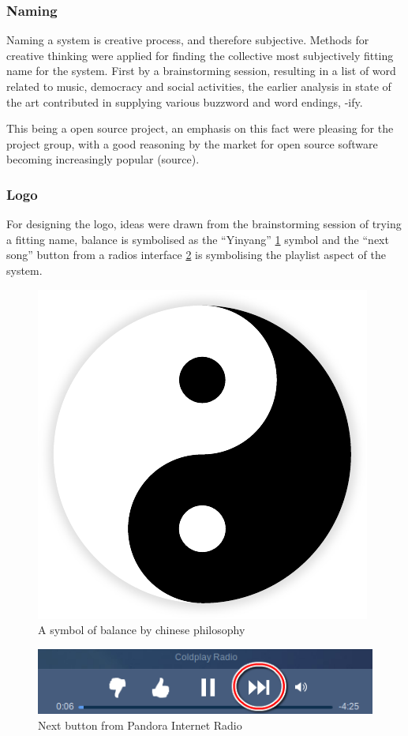 
\subsubsection{Naming}
Naming a system is creative process, and therefore subjective. Methods for creative thinking were applied for finding the collective most subjectively fitting name for the system. First by a brainstorming session, resulting in a list of word related to music, democracy and social activities, the earlier analysis in state of the art contributed in supplying various buzzword and word endings, -ify.

This being a open source project, an emphasis on this fact were pleasing for the project group, with a good reasoning by the market for open source software becoming increasingly popular (source).

\subsubsection{Logo}
For designing the logo, ideas were drawn from the brainstorming session of trying a fitting name, balance is symbolised as the \enquote{Yinyang} \cref{fig:yinyang} symbol and the \enquote{next song} button from a radios interface \cref{fig:vlc} is symbolising the playlist aspect of the system.

\begin{figure}
  \centering
  \includegraphics[width=0.2\linewidth]{Images/Yin-Yang}
  \caption{A symbol of balance by chinese philosophy \cite{yinyangsource} }
  \label{fig:yinyang}
\end{figure}

\begin{figure}
  \centering
  \includegraphics[scale=0.7]{Images/pandoraNext.png}
  \caption{Next button from Pandora Internet Radio}
  \label{fig:vlc}
\end{figure}

